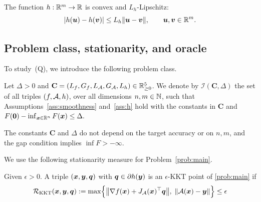 \begin{assumption}
\label{ass:h}
The function $h:\mathbb{R}^m\to\mathbb{R}$ is convex and $L_h$-Lipschitz:
\[
    |h(\bm{u})-h(\bm{v})|\le L_h\|\bm{u}-\bm{v}\|,
    \qquad \bm{u},\bm{v}\in\mathbb{R}^m.
\]
\end{assumption}

\subsection{Problem class, stationarity, and oracle}
\label{subsec:setup}
To study~(Q), we introduce the following problem class.
\begin{definition}
\label{def:problem-class}
Let \(\Delta>0\) and
\(\mathbf C=(L_f,G_f,L_{\mathcal{A}},G_{\mathcal{A}},L_h)\in\mathbb{R}^5_{\ge0}\).
We denote by \(\mathcal I(\mathbf C,\Delta)\) the set of all triples
\((f,\mathcal{A},h)\), over all dimensions \(n,m\in\mathbb{N}\), such that
Assumptions~\ref{ass:smoothness} and~\ref{ass:h} hold with the constants
in \(\mathbf C\) and
\(
    F(\bm{0})-\inf_{\bm{x}\in\mathbb{R}^n}F(\bm{x})\le\Delta .
\)
\end{definition}
The constants \(\mathbf C\) and \(\Delta\) do not depend on the target
accuracy or on \(n,m\), and the gap condition implies \(\inf F>-\infty\).

{We use the following stationarity measure for Problem~\eqref{prob:main}.} 
\begin{definition}
\label{def:eps-kkt}
Given \(\epsilon>0\). A triple \((\bm{x},\bm{y},\bm{q})\) with
\(\bm{q}\in\partial h(\bm{y})\) is an \(\epsilon\)-KKT point of
\eqref{prob:main} if
\begin{equation}
    \mathcal{R}_{\mathrm{KKT}}(\bm{x},\bm{y},\bm{q})
    :=
    \max\Bigl\{
        \bigl\|\nabla f(\bm{x})+J_{\mathcal{A}}(\bm{x})^\top\bm{q}\bigr\|,\;
        \|\mathcal{A}(\bm{x})-\bm{y}\|
    \Bigr\} \leq \epsilon
    \label{eq:kkt-residual}
\end{equation}
\end{definition}

